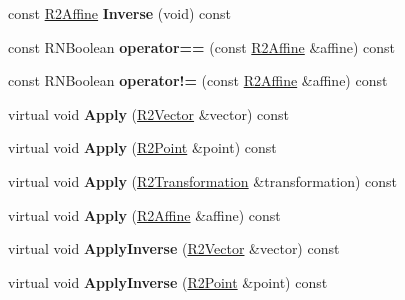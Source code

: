 \begin{DoxyCompactItemize}
\item 
const \hyperlink{class_r2_affine}{R2\+Affine} {\bfseries Inverse} (void) const \hypertarget{class_r2_affine_a1ecb5db09accfc021951507fa8bc71c3}{}\label{class_r2_affine_a1ecb5db09accfc021951507fa8bc71c3}

\item 
const R\+N\+Boolean {\bfseries operator==} (const \hyperlink{class_r2_affine}{R2\+Affine} \&affine) const \hypertarget{class_r2_affine_ab912bab9a532e77a7adc31ca45b4ba5b}{}\label{class_r2_affine_ab912bab9a532e77a7adc31ca45b4ba5b}

\item 
const R\+N\+Boolean {\bfseries operator!=} (const \hyperlink{class_r2_affine}{R2\+Affine} \&affine) const \hypertarget{class_r2_affine_a9f5da2debf8d530d9cc84cf8346d7dbc}{}\label{class_r2_affine_a9f5da2debf8d530d9cc84cf8346d7dbc}

\item 
virtual void {\bfseries Apply} (\hyperlink{class_r2_vector}{R2\+Vector} \&vector) const \hypertarget{class_r2_affine_ae88be855940a4ee7c8570af96e6231a3}{}\label{class_r2_affine_ae88be855940a4ee7c8570af96e6231a3}

\item 
virtual void {\bfseries Apply} (\hyperlink{class_r2_point}{R2\+Point} \&point) const \hypertarget{class_r2_affine_a824715490a1e4c25e8de7e5e7febcea1}{}\label{class_r2_affine_a824715490a1e4c25e8de7e5e7febcea1}

\item 
virtual void {\bfseries Apply} (\hyperlink{class_r2_transformation}{R2\+Transformation} \&transformation) const \hypertarget{class_r2_affine_ac4f92a179bfeb1ccc70666ca613ea69e}{}\label{class_r2_affine_ac4f92a179bfeb1ccc70666ca613ea69e}

\item 
virtual void {\bfseries Apply} (\hyperlink{class_r2_affine}{R2\+Affine} \&affine) const \hypertarget{class_r2_affine_a67c5f12bc5ef56cf38706c9777b3b0cd}{}\label{class_r2_affine_a67c5f12bc5ef56cf38706c9777b3b0cd}

\item 
virtual void {\bfseries Apply\+Inverse} (\hyperlink{class_r2_vector}{R2\+Vector} \&vector) const \hypertarget{class_r2_affine_a85eb1d63c7bc8b5a1dd95ec880099a73}{}\label{class_r2_affine_a85eb1d63c7bc8b5a1dd95ec880099a73}

\item 
virtual void {\bfseries Apply\+Inverse} (\hyperlink{class_r2_point}{R2\+Point} \&point) const \hypertarget{class_r2_affine_a9c61614306572f4b48ccc26b677596e2}{}\label{class_r2_affine_a9c61614306572f4b48ccc26b677596e2}


\end{DoxyCompactItemize}
